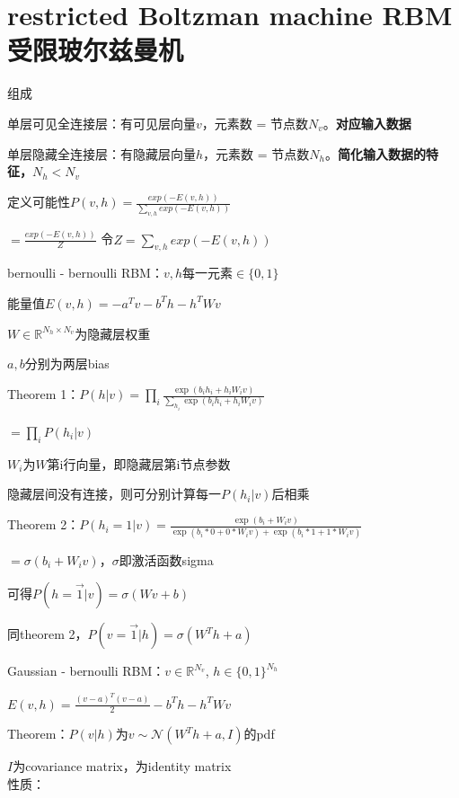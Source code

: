\documentclass[UTF8]{ctexart}
\begin{document}
\section{restricted Boltzman machine RBM 受限玻尔兹曼机}
\noindent 组成

  单层可见全连接层：有可见层向量$v$，元素数 = 节点数$N_v$。\textbf{对应输入数据}
  
  单层隐藏全连接层：有隐藏层向量$h$，元素数 = 节点数$N_h$。\textbf{简化输入数据的特征，$N_h < N_v$}

  定义可能性$P(v, h) = \frac{exp(-E(v, h))}{\sum_{v, h}exp(-E(v, h))}$

  \quad $ = \frac{exp(-E(v, h))}{Z}$ 令$Z = \sum_{v, h}exp(-E(v, h))$
  
  bernoulli - bernoulli RBM：$v, h$每一元素$\in \{0, 1\}$

  \quad 能量值$E(v, h) = -a^Tv - b^Th - h^TWv$

  \quad \quad $W \in \mathbb{R}^{N_h \times N_v}$为隐藏层权重

  \quad \quad $a, b$分别为两层bias

  \quad Theorem 1：$P(h | v) = \prod_i \frac{\exp(b_ih_i + h_iW_{i}v)}{\sum_{h_i}\exp(b_ih_i + h_iW_iv)}$
  
  \quad \quad $ = \prod_i P(h_i | v)$

  \quad \quad $W_i$为$W$第i行向量，即隐藏层第i节点参数

  \quad \quad 隐藏层间没有连接，则可分别计算每一$P(h_i | v)$后相乘

  \quad Theorem 2：$P(h_i = 1 | v) = \frac{\exp(b_i + W_{i}v)}{\exp(b_i * 0 + 0 * W_iv) + \exp(b_i * 1 + 1 * W_iv)}$

  \quad \quad $ = \sigma(b_i + W_{i}v)$，$\sigma$即激活函数sigma

  \quad \quad 可得$P(h = \vec{1} | v) = \sigma(Wv + b)$

  \quad 同theorem 2，$P(v = \vec{1} | h) = \sigma(W^Th + a)$

  Gaussian - bernoulli RBM：$v \in \mathbb{R}^{N_v}$, $h \in \{0, 1\}^{N_h}$

  \quad $E(v, h) = \frac{(v - a)^T(v - a)}{2} - b^Th - h^TWv$

  \quad Theorem：$P(v | h)$为$v \sim \mathcal{N}(W^Th + a, I)$的pdf

  \quad \quad $I$为covariance matrix，为identity matrix\\
性质：
\end{document}
